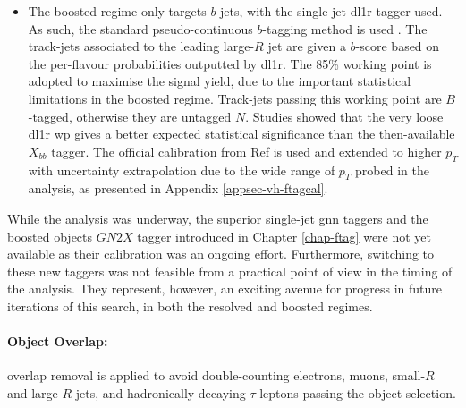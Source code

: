 \begin{itemize}
  \item The boosted regime only targets $b$-jets, with the single-jet \gls{dl1r} tagger used. As such, the standard pseudo-continuous $b$-tagging method is used \cite{atlas:FTAGRUN2}. The track-jets associated to the leading large-$R$ jet are given a $b$-score based on the per-flavour probabilities outputted by \gls{dl1r}. The 85\% working point is adopted to maximise the signal yield, due to the important statistical limitations in the boosted regime. Track-jets passing this working point are $B$-tagged, otherwise they are untagged $N$. Studies showed that the very loose \gls{dl1r} \gls{wp} gives a better expected statistical significance than the then-available $X_{bb}$ tagger. The official calibration from Ref \cite{atlas:FTAGRUN2} is used and extended to higher $p_T$ with uncertainty extrapolation due to the wide range of $p_T$ probed in the analysis, as presented in Appendix \ref{appsec-vh-ftagcal}.
\end{itemize}
While the analysis was underway, the superior single-jet \gls{gnn} taggers and the boosted objects $GN2X$ tagger introduced in Chapter \ref{chap-ftag} were not yet available as their calibration was an ongoing effort. Furthermore, switching to these new taggers was not feasible from a practical point of view in the timing of the analysis. They represent, however, an exciting avenue for progress in future iterations of this search, in both the resolved and boosted regimes. \\ %

\paragraph{Object Overlap:} overlap removal is applied to avoid double-counting electrons, muons, small-$R$ and large-$R$ jets, and hadronically decaying $\tau$-leptons passing the object selection.

